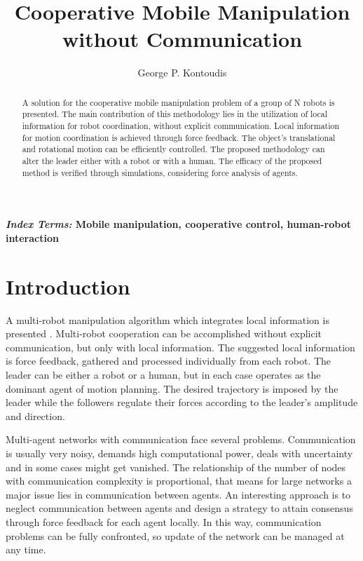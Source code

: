 \documentclass[letterpaper, 10 pt, conference]{ieeeconf}
\title{\LARGE \bf Cooperative Mobile Manipulation without Communication}
\author{George P. Kontoudis}
\begin{document}
\maketitle
\thispagestyle{empty}
\pagestyle{empty}

\begin{abstract}
A solution for the cooperative mobile manipulation problem of a group of N robots is presented. The main contribution of this methodology lies in the utilization of local information for robot coordination, without explicit communication. Local information for motion coordination is achieved through force feedback. The object's translational and rotational motion can be efficiently controlled. The proposed methodology can alter the leader either with a robot or with a human. The efficacy of the proposed method is verified through simulations, considering force analysis of agents.   
\end{abstract}

\normalsize{\bf\small\emph{Index Terms:} Mobile manipulation, cooperative control, human-robot interaction}  
\section{Introduction}\label{intro}

A multi-robot manipulation algorithm which integrates local information is presented \cite{wang2016force}. Multi-robot cooperation can be accomplished without explicit communication, but only with local information. The suggested local information is force feedback, gathered and processed individually from each robot. The leader can be either a robot or a human, but in each case operates as the dominant agent of motion planning. The desired trajectory is imposed by the leader while the followers regulate their forces according to the leader's amplitude and direction.   

Multi-agent networks with communication face several problems. Communication is usually very noisy, demands high computational power, deals with uncertainty and in some cases might get vanished. The relationship of the number of nodes with communication complexity is proportional, that means for large networks a major issue lies in communication between agents. An interesting approach is to neglect communication between agents and design a strategy to attain consensus through force feedback for each agent locally. In this way, communication problems can be fully confronted, so update of the network can be managed at any time. 
\end{document}
